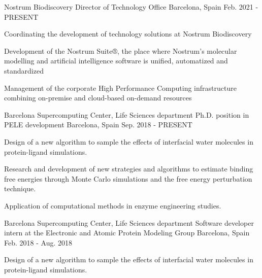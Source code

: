 
\begin{cventries}

  \cventry
    {Nostrum Biodiscovery} %
    {Director of Technology Office} %
    {Barcelona, Spain} %
    {Feb. 2021 - PRESENT} %
    {
      \begin{cvitems} %
        \item {Coordinating the development of technology solutions at Nostrum Biodiscovery}
        \item {Development of the Nostrum Suite®, the place where Nostrum's molecular modelling and artificial intelligence software is unified, automatized and standardized}
        \item {Management of the corporate High Performance Computing infrastructure combining on-premise and cloud-based on-demand resources}
      \end{cvitems}
    }

  \cventry
    {Barcelona Supercomputing Center, Life Sciences department} %
    {Ph.D. position in PELE development} %
    {Barcelona, Spain} %
    {Sep. 2018 - PRESENT} %
    {
      \begin{cvitems} %
        \item {Design of a new algorithm to sample the effects of interfacial water molecules in protein-ligand simulations.}
        \item {Research and development of new strategies and algorithms to estimate binding free energies through Monte Carlo simulations and the free energy perturbation technique.}
        \item {Application of computational methods in enzyme engineering studies.}
      \end{cvitems}
    }

  \cventry
    {Barcelona Supercomputing Center, Life Sciences department} %
    {Software developer intern at the Electronic and Atomic Protein Modeling Group} %
    {Barcelona, Spain} %
    {Feb. 2018 - Aug. 2018} %
    {
      \begin{cvitems} %
        \item {Design of a new algorithm to sample the effects of interfacial water molecules in protein-ligand simulations.}
      \end{cvitems}
    }


\end{cventries}
